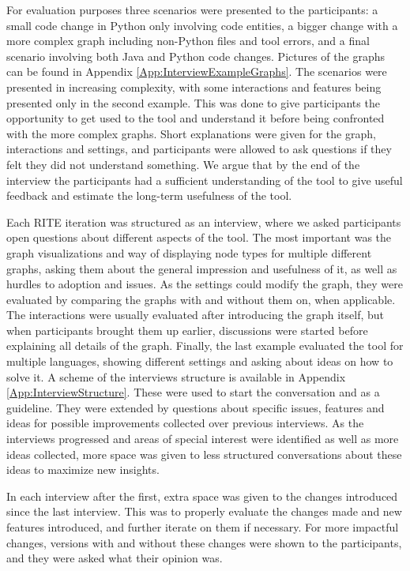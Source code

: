 \documentclass[a4paper,11pt,twoside]{article}
\theoremstyle{definition} %
\begin{document}
For evaluation purposes three scenarios were presented to the participants: a small code change in Python only involving code entities, a bigger change with a more complex graph including non-Python files and tool errors, and a final scenario involving both Java and Python code changes. Pictures of the graphs can be found in Appendix \ref{App:InterviewExampleGraphs}. The scenarios were presented in increasing complexity, with some interactions and features being presented only in the second example. This was done to give participants the opportunity to get used to the tool and understand it before being confronted with the more complex graphs. Short explanations were given for the graph, interactions and settings, and participants were allowed to ask questions if they felt they did not understand something. We argue that by the end of the interview the participants had a sufficient understanding of the tool to give useful feedback and estimate the long-term usefulness of the tool. 

Each RITE iteration was structured as an interview, where we asked participants open questions about different aspects of the tool. The most important was the graph visualizations and way of displaying node types for multiple different graphs, asking them about the general impression and usefulness of it, as well as hurdles to adoption and issues. As the settings could modify the graph, they were evaluated by comparing the graphs with and without them on, when applicable. The interactions were usually evaluated after introducing the graph itself, but when participants brought them up earlier, discussions were started before explaining all details of the graph. Finally, the last example evaluated the tool for multiple languages, showing different settings and asking about ideas on how to solve it. A scheme of the interviews structure is available in Appendix \ref{App:InterviewStructure}. These were used to start the conversation and as a guideline. They were extended by questions about specific issues, features and ideas for possible improvements collected over previous interviews. As the interviews progressed and areas of special interest were identified as well as more ideas collected, more space was given to less structured conversations about these ideas to maximize new insights. 

In each interview after the first, extra space was given to the changes introduced since the last interview. This was to properly evaluate the changes made and new features introduced, and further iterate on them if necessary. For more impactful changes, versions with and without these changes were shown to the participants, and they were asked what their opinion was. 
\end{document}
